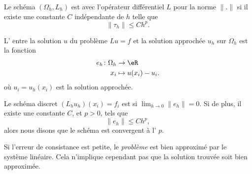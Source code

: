 \begin{definition}
	Le schéma \( (\Omega_h,L_h)\) est  avec l'opérateur différentiel \( L\) pour la norme \( \| . \|\) si il existe une constante \( C\) indépendante de \( h\) telle que
	\begin{equation}
		\| \tau_h \|\leq Ch^p.
	\end{equation}
\end{definition}

\begin{definition}
	L' entre la solution \( u\) du problème \( Lu=f\) et la solution approchée \( u_h\) sur \( \Omega_h\) est la fonction
	\begin{equation}
		\begin{aligned}
			e_h\colon \Omega_h & \to \eR             \\
			x_i                & \mapsto u(x_i)-u_i.
		\end{aligned}
	\end{equation}
	où \( u_i=u_h(x_i)\) est la solution approchée.

	Le schéma discret \( (L_hu_h)(x_i)=f_i\) est  si \( \lim_{h\to 0} \| e_h \|=0\). Si de plus, il existe une constante \( C\), et \( p>0\), tels que
	\begin{equation}
		\| e_h \|\leq Ch^p,
	\end{equation}
	alors nous disons que le schéma est convergent à l' \( p\).
\end{definition}

Si l'erreur de consistance est petite, le \emph{problème} est bien approximé par le système linéaire. Cela n'implique cependant pas que la solution trouvée soit bien approximée.

